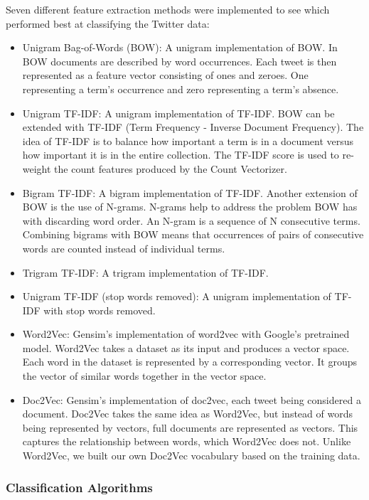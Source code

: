 Seven different feature extraction methods were implemented to see which performed best at classifying the Twitter data:
\begin{itemize}
    \item Unigram Bag-of-Words (BOW): A unigram implementation of BOW. In BOW documents are described by word occurrences. Each tweet is then represented as a feature vector consisting of ones and zeroes. One representing a term's occurrence and zero representing a term's absence.
    \item Unigram TF-IDF: A unigram implementation of TF-IDF. BOW can be extended with TF-IDF (Term Frequency - Inverse Document Frequency). The idea of TF-IDF is to balance how important a term is in a document versus how important it is in the entire collection. The TF-IDF score is used to re-weight the count features produced by the Count Vectorizer.
    \item Bigram TF-IDF: A bigram implementation of TF-IDF. Another extension of BOW is the use of N-grams. N-grams help to address the problem BOW has with discarding word order. An N-gram is a sequence of N consecutive terms. Combining bigrams with BOW means that occurrences of pairs of consecutive words are counted instead of individual terms.
    \item Trigram TF-IDF: A trigram implementation of TF-IDF.
    \item Unigram TF-IDF (stop words removed): A unigram implementation of TF-IDF with stop words removed.
    \item Word2Vec: Gensim's implementation of word2vec with Google's pretrained model. Word2Vec takes a dataset as its input and produces a vector space. Each word in the dataset is represented by a corresponding vector. It groups the vector of similar words together in the vector space. 
    \item Doc2Vec: Gensim's implementation of doc2vec, each tweet being considered a document. Doc2Vec takes the same idea as Word2Vec, but instead of words being represented by vectors, full documents are represented as vectors. This captures the relationship between words, which Word2Vec does not. Unlike Word2Vec, we built our own Doc2Vec vocabulary based on the training data.
\end{itemize}

\subsubsection{Classification Algorithms}

